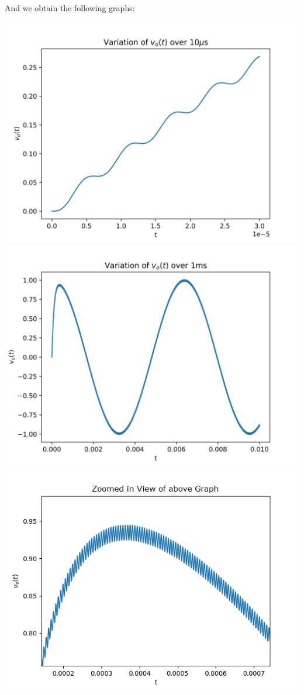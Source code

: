 \documentclass[12pt]{article}
\begin{document}
And we obtain the following graphs:
\begin{center}
    \includegraphics[scale=1]{images/fig6.png}
    \includegraphics[scale=1]{images/fig7.png}
    \includegraphics[scale=1.2]{images/fig8.png}
\end{center}
\end{document}
